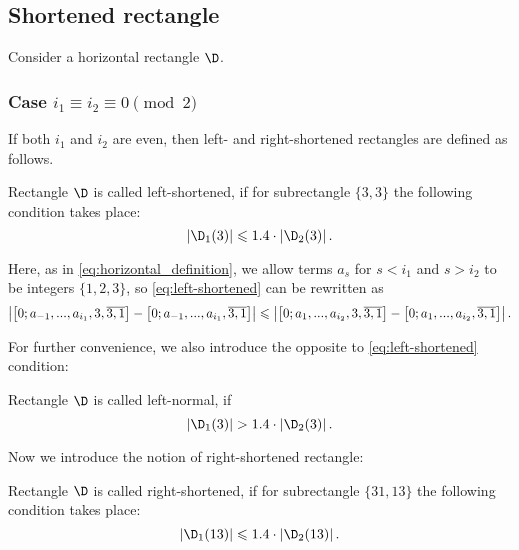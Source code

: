 \subsection{Shortened rectangle}
\label{sbsc:shortened}

Consider a horizontal rectangle $\D$.


\subsubsection{Case $i_1 \equiv i_2 \equiv 0 \pmod 2$}
\label{sbsbsc:shortened_even}

If both $i_1$ and $i_2$ are even, then left- and right-shortened rectangles are defined as follows.

\begin{definition}
	Rectangle $\D$ is called left-shortened,
	if for subrectangle $\{3, 3\}$ the following condition takes place:
	\begin{equation}
		\label{eq:left-shortened}
		\left| \D_1(3) \right| \leqslant 1.4 \cdot \left| \D_2(3) \right|.
	\end{equation}
\end{definition}

Here, as in \ref{eq:horizontal_definition},
we allow terms $a_s$ for $s < i_1$ and $s > i_2$ to be integers $\{1, 2, 3\}$,
so \ref{eq:left-shortened} can be rewritten as
%
\begin{equation*}
	\hspace*{-1pt}
	\left|
		\left[ 0; a_{-1}, ..., a_{i_1}, 3, \overline{3, 1} \right] -
		\left[ 0; a_{-1}, ..., a_{i_1}, \overline{3, 1} \right]
	\right| \leqslant \left|
		\left[ 0; a_{1}, ..., a_{i_2}, 3, \overline{3, 1} \right] -
		\left[ 0; a_{1}, ..., a_{i_2}, \overline{3, 1} \right]
	\right|.
	\hspace*{-1pt}
\end{equation*}

For further convenience, we also introduce the opposite to \ref{eq:left-shortened} condition:

\begin{definition}
	Rectangle $\D$ is called left-normal, if
	\begin{equation}
		\label{eq:left-normal}
		\left| \D_1(3) \right| > 1.4 \cdot \left| \D_2(3) \right|.
	\end{equation}
\end{definition}

Now we introduce the notion of right-shortened rectangle:

\begin{definition}
	Rectangle $\D$ is called right-shortened,
	if for subrectangle $\{31, 13\}$ the following condition takes place:
	\begin{equation}
		\label{eq:right-shortened}
		\left| \D_1(13) \right| \leqslant 1.4 \cdot \left| \D_2(13) \right|.
	\end{equation}
\end{definition}

